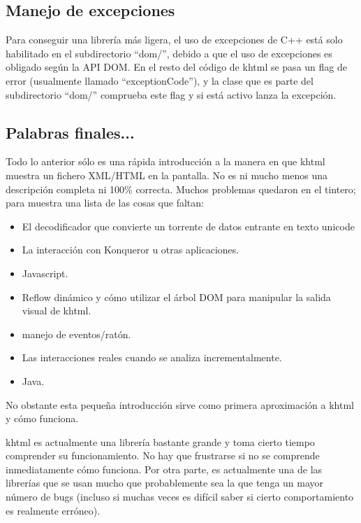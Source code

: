 \subsection{Manejo de excepciones}\label{khtml_trycatch} 

Para conseguir una librería más ligera, el uso de excepciones de C++ está solo habilitado en el subdirectorio ``dom/'', debido a que el uso de excepciones es obligado según la API DOM. En el resto del código de khtml se pasa un flag de error (usualmente llamado ``exceptionCode''), y la clase que es parte del subdirectorio ``dom/'' comprueba este flag y si está activo lanza la excepción.


\subsection{Palabras finales...}\label{khtml_final} 

Todo lo anterior sólo es una rápida introducción a la manera en que khtml muestra un fichero XML/HTML en la pantalla. No es ni mucho menos una descripción completa ni 100\% correcta. Muchos problemas quedaron en el tintero; para muestra una lista de las cosas que faltan:

\begin{itemize}
 \item El decodificador que convierte un torrente de datos entrante en texto unicode
 \item La interacción con Konqueror u otras aplicaciones.
 \item Javascript.
 \item Reflow dinámico y cómo utilizar el árbol DOM para manipular la salida visual de khtml.
 \item manejo de eventos/ratón.
 \item Las interacciones reales cuando se analiza incrementalmente.
 \item Java.
\end{itemize}

No obstante esta pequeña introducción sirve como primera aproximación a khtml y cómo funciona.

khtml es actualmente una librería bastante grande y toma cierto tiempo comprender su funcionamiento. No hay que frustrarse si no se comprende inmediatamente cómo funciona. Por otra parte, es actualmente una de las librerías que se usan mucho que probablemente sea la que tenga un mayor número de bugs (incluso si muchas veces es difícil saber si cierto comportamiento es realmente erróneo).

